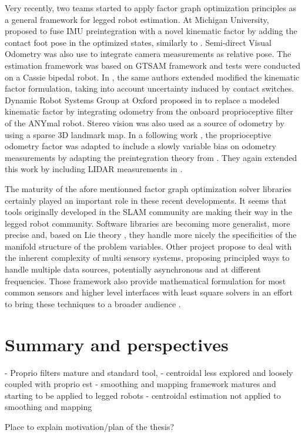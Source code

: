 Very recently, two teams started to apply factor graph optimization principles as a general framework for legged robot estimation. At Michigan University, \cite{hartley2018legged} 
proposed to fuse IMU preintegration with a novel kinematic factor by adding the contact foot pose in the optimized states, similarly to \cite{bloesch2013state,rotella2014state}. 
Semi-direct Visual Odometry \cite{forster2014svo} was also use to integrate camera measurements as relative pose. The estimation framework was based on GTSAM framework \cite{dellaert2012factor}
and tests were conducted on a Cassie bipedal robot. In \cite{hartley2018hybrid}, the same authors extended 
modified the kinematic factor formulation, taking into account uncertainty induced by contact switches. Dynamic Robot Systems Group at Oxford proposed in 
\cite{wisth2019robust} to replace a modeled kinematic factor by integrating odometry from the onboard proprioceptive filter of the ANYmal robot. Stereo vision was also used as a source of
odometry by using a sparse 3D landmark map. In a following work \cite{wisth2020preintegrated}, the proprioceptive odometry factor was adapted
to include a slowly variable bias on odometry measurements by adapting the preintegration theory from \cite{forster2017-TRO}. They again extended this work
by including LIDAR measurements in \cite{wisth2021vilens}.


The maturity of the afore mentionned factor graph optimization solver libraries certainly played an important role in these recent developments. It seems
that tools originally developed in the SLAM community are making their way in the legged robot community. Software libraries are becoming more
generalist, more precise and, based on Lie theory \cite{sola2018micro}, they handle more nicely the specificities of the manifold structure of the problem variables.
Other project propose to deal with the inherent complexity of multi sensory systems, proposing principled ways to handle multiple data sources, potentially asynchronous and at
different frequencies. Those framework also provide mathematical formulation for most common sensors and higher level interfaces with least square solvers 
in an effort to bring these techniques to a broader audience \cite{sola2021wolf, blanco2019modular, colosi2020plug}.



\section{Summary and perspectives}
- Proprio filters mature and standard tool, 
- centroidal less explored and loosely coupled with proprio est
- smoothing and mapping framework matures and starting to be applied to legged robots
- centroidal estimation not applied to smoothing and mapping

Place to explain motivation/plan of the thesis?
